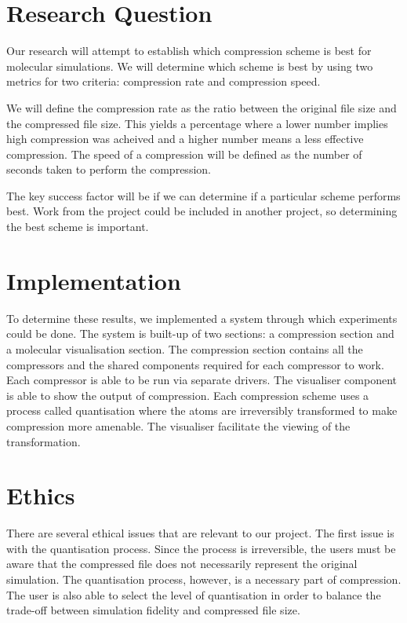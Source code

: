 \documentclass[a4paper,11pt]{report}
\begin{document}
\section{Research Question}

Our research will attempt to establish which compression scheme is best for molecular simulations. We will determine which scheme is best by using two metrics for two criteria: compression rate and compression speed.

We will define the compression rate as the ratio between the original file size and the compressed file size. This yields a percentage where a lower number implies high compression was acheived and a higher number means a less effective compression. The speed of a compression will be defined as the number of seconds taken to perform the compression.

The key success factor will be if we can determine if a particular scheme performs best. Work from the project could be included in another project, so determining the best scheme is important.
 
\section{Implementation}

To determine these results, we implemented a system through which experiments could be done. The system is built-up of two sections: a compression section and a molecular visualisation section. The compression section contains all the compressors and the shared components required for each compressor to work. Each compressor is able to be run via separate drivers. The visualiser component is able to show the output of compression. Each compression scheme uses a process called quantisation where the atoms are irreversibly transformed to make compression more amenable. The visualiser facilitate the viewing of the transformation.

\section{Ethics}

There are several ethical issues that are relevant to our project. The first issue is with the quantisation process. Since the process is irreversible, the users must be aware that the compressed file does not necessarily represent the original simulation. The quantisation process, however, is a necessary part of compression. The user is also able to select the level of quantisation in order to balance the trade-off between simulation fidelity and compressed file size. 
\end{document}
